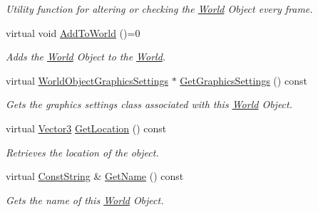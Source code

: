 \begin{DoxyCompactItemize}
\begin{DoxyCompactList}\small\item\em Utility function for altering or checking the \hyperlink{classMezzanine_1_1World}{World} Object every frame. \item\end{DoxyCompactList}\item 
\hypertarget{classMezzanine_1_1WorldObject_a73f51f4025bfbb1f86075de45d33d10a}{
virtual void \hyperlink{classMezzanine_1_1WorldObject_a73f51f4025bfbb1f86075de45d33d10a}{AddToWorld} ()=0}
\label{classMezzanine_1_1WorldObject_a73f51f4025bfbb1f86075de45d33d10a}

\begin{DoxyCompactList}\small\item\em Adds the \hyperlink{classMezzanine_1_1World}{World} Object to the \hyperlink{classMezzanine_1_1World}{World}. \item\end{DoxyCompactList}\item 
virtual \hyperlink{classMezzanine_1_1WorldObjectGraphicsSettings}{WorldObjectGraphicsSettings} $\ast$ \hyperlink{classMezzanine_1_1WorldObject_a7ce5266a3f5a31a3528f6fdba043aa0e}{GetGraphicsSettings} () const 
\begin{DoxyCompactList}\small\item\em Gets the graphics settings class associated with this \hyperlink{classMezzanine_1_1World}{World} Object. \item\end{DoxyCompactList}\item 
virtual \hyperlink{classMezzanine_1_1Vector3}{Vector3} \hyperlink{classMezzanine_1_1WorldObject_a66d040856234ceacfbba2532047ee9cb}{GetLocation} () const 
\begin{DoxyCompactList}\small\item\em Retrieves the location of the object. \item\end{DoxyCompactList}\item 
virtual \hyperlink{namespaceMezzanine_a63cd699ac54b73953f35ec9cfc05e506}{ConstString} \& \hyperlink{classMezzanine_1_1WorldObject_ace3603d68df4db612c3233df0b0af512}{GetName} () const 
\begin{DoxyCompactList}\small\item\em Gets the name of this \hyperlink{classMezzanine_1_1World}{World} Object. \item\end{DoxyCompactList}\item 

\end{DoxyCompactItemize}

